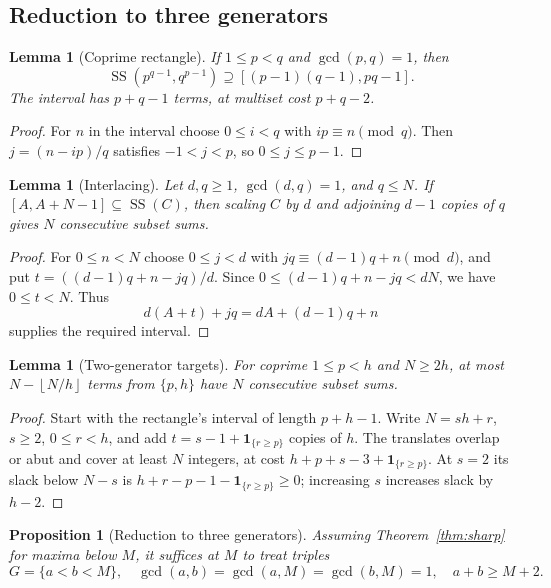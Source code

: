 \documentclass[11pt,a4paper,reqno]{amsart}
\newtheorem{lemma}[theorem]{Lemma}
\newtheorem{proposition}[theorem]{Proposition}
\theoremstyle{definition}
\theoremstyle{remark}
\newcommand{\ssum}{\operatorname{SS}}
\newcommand{\floor}[1]{\left\lfloor #1\right\rfloor}
\newcommand{\ind}{\mathbf 1}
\begin{document}
\subsection{Reduction to three generators}
\begin{lemma}[Coprime rectangle]\label{lem:rectangle}
If $1\le p<q$ and $\gcd(p,q)=1$, then
\[
 \ssum(p^{q-1},q^{p-1})\supseteq[(p-1)(q-1),pq-1].
\]
The interval has $p+q-1$ terms, at multiset cost $p+q-2$.
\end{lemma}
\begin{proof}
For $n$ in the interval choose $0\le i<q$ with $ip\equiv n\pmod q$.
Then $j=(n-ip)/q$ satisfies $-1<j<p$, so $0\le j\le p-1$.
\end{proof}
\begin{lemma}[Interlacing]\label{lem:interlace}
Let $d,q\ge1$, $\gcd(d,q)=1$, and $q\le N$. If $[A,A+N-1]\subseteq\ssum(C)$,
then scaling $C$ by $d$ and adjoining $d-1$ copies of $q$ gives $N$
consecutive subset sums.
\end{lemma}
\begin{proof}
For $0\le n<N$ choose $0\le j<d$ with
$jq\equiv(d-1)q+n\pmod d$, and put $t=((d-1)q+n-jq)/d$.
Since $0\le(d-1)q+n-jq<dN$, we have $0\le t<N$. Thus
\[
 d(A+t)+jq=dA+(d-1)q+n
\]
supplies the required interval.
\end{proof}
\begin{lemma}[Two-generator targets]\label{lem:long-target}
For coprime $1\le p<h$ and $N\ge2h$, at most $N-\floor{N/h}$ terms
from $\{p,h\}$ have $N$ consecutive subset sums.
\end{lemma}
\begin{proof}
Start with the rectangle's interval of length $p+h-1$. Write $N=sh+r$,
$s\ge2$, $0\le r<h$, and add $t=s-1+\ind_{\{r\ge p\}}$ copies of $h$.
The translates overlap or abut and cover at least $N$ integers, at cost
$h+p+s-3+\ind_{\{r\ge p\}}$. At $s=2$ its slack below $N-s$ is
$h+r-p-1-\ind_{\{r\ge p\}}\ge0$; increasing $s$ increases slack by $h-2$.
\end{proof}
\begin{proposition}[Reduction to three generators]\label{prop:funnel}
Assuming Theorem~\ref{thm:sharp} for maxima below $M$, it suffices at $M$ to treat triples
\begin{equation}\label{eq:funnel}
 G=\{a<b<M\},\quad
 \gcd(a,b)=\gcd(a,M)=\gcd(b,M)=1,\quad a+b\ge M+2.
\end{equation}
\end{proposition}
\end{document}
